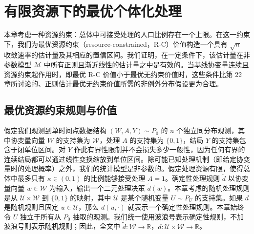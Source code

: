 \chapter{有限资源下的最优个体化处理}
\label{ch:resource-constrained-treatment}

\begin{sourcebox}
本章考虑一种资源约束：总体中可接受处理的人口比例存在一个上限。在这一约束下，我们为最优资源约束（resource-constrained，R-C）价值构造一个具有 $\sqrt n$ 收敛速率的估计量及其相应的置信区间。我们证明，在一定条件下，该估计量在非参数模型 $\mathcal M$ 中所有正则且渐近线性的估计量之中是有效的。当基线协变量连续且资源约束起作用时，即最优 R-C 价值小于最优无约束价值时，这些条件比第 22 章所讨论的、正则估计最优无约束价值所需的非例外分布假设更为合理。
\end{sourcebox}

\section{最优资源约束规则与价值}

假定我们观测到单时间点数据结构 $(W,A,Y)\sim P_0$ 的 $n$ 个独立同分布观测，其中协变量向量 $W$ 的支持集为 $\mathcal W$，处理 $A$ 的支持集为 $\{0,1\}$，结局 $Y$ 的支持集包含于闭单位区间。对 $Y$ 作此有界性限制并不会损失多少一般性，因为任何有界的连续结局都可以通过线性变换缩放到单位区间。除可能已知处理机制（即给定协变量时的处理概率）之外，我们的统计模型是非参数的。假定处理资源有限，使得总体中最多只有 $\kappa\in(0,1)$ 的比例能够接受处理 $A=1$。确定性处理规则 $\tilde d$ 以协变量向量 $w\in\mathcal W$ 为输入，输出一个二元处理决策 $\tilde d(w)$。本章考虑的随机处理规则是从 $\mathcal U\times\mathcal W$ 到 $\{0,1\}$ 的映射，其中 $\mathcal U$ 是某个随机变量 $U\sim P_U$ 的支持集。如果 $d$ 是随机规则且固定 $u\in\mathcal U$，那么 $d(u,\cdot)$ 就表示一个确定性处理规则。本章始终令 $U$ 独立于所有从 $P_0$ 抽取的观测。我们统一使用波浪号表示确定性规则，不加波浪号则表示随机规则；因此，全文中 $\tilde d:\mathcal W\to\mathbb R$，$d:\mathcal U\times\mathcal W\to\mathbb R$。

